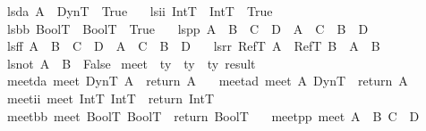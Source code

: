 \begin{isabellebody}
\ \ lsda{\isacharcolon}\ {\isachardoublequoteopen}A\ {\isasymsqsubseteq}\ DynT\ {\isacharequal}\ True{\isachardoublequoteclose}\ {\isacharbar}\isanewline
\ \ lsii{\isacharcolon}\ {\isachardoublequoteopen}IntT\ {\isasymsqsubseteq}\ IntT\ {\isacharequal}\ True{\isachardoublequoteclose}\ {\isacharbar}\isanewline
\ \ lsbb{\isacharcolon}\ {\isachardoublequoteopen}BoolT\ {\isasymsqsubseteq}\ BoolT\ {\isacharequal}\ True{\isachardoublequoteclose}\ {\isacharbar}\isanewline
\ \ lspp{\isacharcolon}\ {\isachardoublequoteopen}{\isacharparenleft}A\ {\isasymtimes}\ B{\isacharparenright}\ {\isasymsqsubseteq}\ {\isacharparenleft}C\ {\isasymtimes}\ D{\isacharparenright}\ {\isacharequal}\ {\isacharparenleft}A\ {\isasymsqsubseteq}\ C\ {\isasymand}\ B\ {\isasymsqsubseteq}\ D{\isacharparenright}{\isachardoublequoteclose}\ {\isacharbar}\isanewline
\ \ lsff{\isacharcolon}\ {\isachardoublequoteopen}{\isacharparenleft}A\ {\isasymrightarrow}\ B{\isacharparenright}\ {\isasymsqsubseteq}\ {\isacharparenleft}C\ {\isasymrightarrow}\ D{\isacharparenright}\ {\isacharequal}\ {\isacharparenleft}A\ {\isasymsqsubseteq}\ C\ {\isasymand}\ B\ {\isasymsqsubseteq}\ D{\isacharparenright}{\isachardoublequoteclose}\ {\isacharbar}\isanewline
\ \ lsrr{\isacharcolon}\ {\isachardoublequoteopen}{\isacharparenleft}RefT\ A{\isacharparenright}\ {\isasymsqsubseteq}\ {\isacharparenleft}RefT\ B{\isacharparenright}\ {\isacharequal}\ {\isacharparenleft}A\ {\isasymsqsubseteq}\ B{\isacharparenright}{\isachardoublequoteclose}\ {\isacharbar}\isanewline
\ \ lsnot{\isacharcolon}\ {\isachardoublequoteopen}A\ {\isasymsqsubseteq}\ B\ {\isacharequal}\ False{\isachardoublequoteclose}\isanewline
\isanewline
{}\isamarkupfalse \ meet\ {\isacharcolon}{\isacharcolon}\ {\isachardoublequoteopen}ty\ {\isasymRightarrow}\ ty\ {\isasymRightarrow}\ ty\ result{\isachardoublequoteclose}\ \isanewline
\ \ meetda{\isacharcolon}\ {\isachardoublequoteopen}meet\ DynT\ A\ {\isacharequal}\ return\ A{\isachardoublequoteclose}\ {\isacharbar}\isanewline
\ \ meetad{\isacharcolon}\ {\isachardoublequoteopen}meet\ A\ DynT\ {\isacharequal}\ return\ A{\isachardoublequoteclose}\ {\isacharbar}\isanewline
\ \ meetii{\isacharcolon}\ {\isachardoublequoteopen}meet\ IntT\ IntT\ {\isacharequal}\ return\ IntT{\isachardoublequoteclose}\ {\isacharbar}\isanewline
\ \ meetbb{\isacharcolon}\ {\isachardoublequoteopen}meet\ BoolT\ BoolT\ {\isacharequal}\ return\ BoolT{\isachardoublequoteclose}\ {\isacharbar}\isanewline
\ \ meetpp{\isacharcolon}\ {\isachardoublequoteopen}meet\ {\isacharparenleft}A\ {\isasymtimes}\ B{\isacharparenright}\ {\isacharparenleft}C\ {\isasymtimes}\ D{\isacharparenright}\ {\isacharequal}\ \isanewline

\end{isabellebody}

